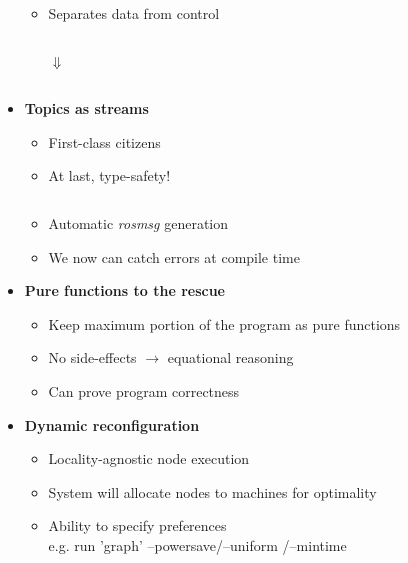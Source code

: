 \documentclass[hyperref={pdfpagelayout=SinglePage}]{beamer}
\begin{document}
\begin{frame}[allowframebreaks]
\begin{itemize}
\begin{itemize}
			\framebreak
			\item Separates data from control \\
			\inputminted[fontsize=\scriptsize]{cpp}{code/control-data/imper.cpp}
			\hspace{60pt} $\Downarrow$ \\
			\inputminted[fontsize=\scriptsize]{hs}{code/control-data/flow.hs}		
			\end{itemize}
			\framebreak
		\item \textbf{Topics as streams}
			\begin{itemize}
			\item First-class citizens
			\item At last, type-safety!
			\inputminted[fontsize=\scriptsize]{hs}{code/typed_stream.hs}
			\item Automatic \textit{rosmsg} generation
			\item We now can catch errors at compile time
			\end{itemize}
		\item \textbf{Pure functions to the rescue}
			\begin{itemize}
			\item Keep maximum portion of the program as pure functions
			\item No side-effects $\rightarrow$ equational reasoning
			\item Can prove program correctness
			\end{itemize}
		\framebreak		
		\item \textbf{Dynamic reconfiguration}
			\begin{itemize}
			\item Locality-agnostic node execution
			\item System will allocate nodes to machines for optimality
			\item Ability to specify preferences \\ e.g. run 'graph' --powersave/--uniform /--mintime
			\end{itemize}

\end{itemize}
\end{frame}
\end{document}
